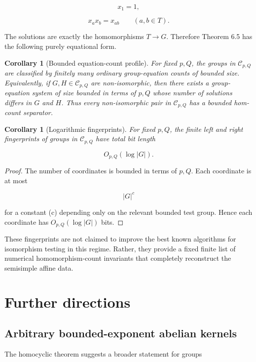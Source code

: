\documentclass[11pt]{article}
\newtheorem{corollary}[theorem]{Corollary}
\begin{document}
\[
x_1=1,
\]

\[
x_ax_b=x_{ab}
\qquad(a,b\in T).
\]

The solutions are exactly the homomorphisms $T\to G$. Therefore Theorem 6.5 has the following purely equational form.

\begin{corollary}[Bounded equation-count profile]
For fixed $p,Q$, the groups in $\mathcal C_{p,Q}$ are classified by finitely many ordinary group-equation counts of bounded size. Equivalently, if $G,H\in\mathcal C_{p,Q}$ are non-isomorphic, then there exists a group-equation system of size bounded in terms of $p,Q$ whose number of solutions differs in $G$ and $H$. Thus every non-isomorphic pair in $\mathcal C_{p,Q}$ has a bounded hom-count separator.

\end{corollary}

\begin{corollary}[Logarithmic fingerprints]
For fixed $p,Q$, the finite left and right fingerprints of groups in $\mathcal C_{p,Q}$ have total bit length

\[
O_{p,Q}(\log |G|).
\]

\end{corollary}

\begin{proof}
The number of coordinates is bounded in terms of $p,Q$. Each coordinate is at most

\[
|G|^c
\]

for a constant (c) depending only on the relevant bounded test group. Hence each coordinate has $O_{p,Q}(\log |G|)$ bits.

\end{proof}

These fingerprints are not claimed to improve the best known algorithms for isomorphism testing in this regime. Rather, they provide a fixed finite list of numerical homomorphism-count invariants that completely reconstruct the semisimple affine data.

\section{Further directions}

\subsection{Arbitrary bounded-exponent abelian kernels}

The homocyclic theorem suggests a broader statement for groups
\end{document}
